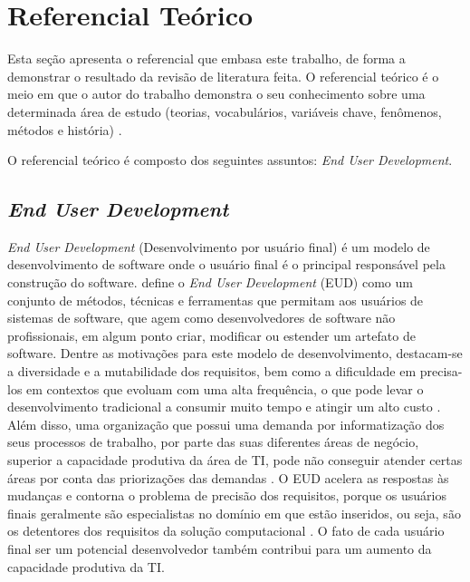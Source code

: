 \chapter[Referencial Teórico]{Referencial Teórico}

Esta seção apresenta o referencial que embasa este trabalho, de forma a demonstrar o resultado da revisão de literatura feita. O referencial teórico é o meio em que o autor do trabalho demonstra o seu conhecimento sobre uma determinada área de estudo (teorias, vocabulários, variáveis chave, fenômenos, métodos e história) \cite{randolph2009}.

O referencial teórico é composto dos seguintes assuntos: \textit{End User Development}.


\section{\textit{End User Development}}

\textit{End User Development} (Desenvolvimento por usuário final) é um modelo de desenvolvimento de software onde o usuário final é o principal responsável pela construção do software.  define o \textit{End User Development} (EUD) como um conjunto de métodos, técnicas e ferramentas que permitam aos usuários de sistemas de software, que agem como desenvolvedores de software não profissionais, em algum ponto criar, modificar ou estender um artefato de software. Dentre as motivações para este modelo de desenvolvimento, destacam-se a diversidade e a mutabilidade dos requisitos, bem como a dificuldade em precisa-los em contextos que evoluam com uma alta frequência, o que pode levar o desenvolvimento tradicional a consumir muito tempo e atingir um alto custo \cite{lieberman2006}. Além disso, uma organização que possui uma demanda por informatização dos seus processos de trabalho, por parte das suas diferentes áreas de negócio, superior a capacidade produtiva da área de TI, pode não conseguir atender certas áreas por conta das priorizações das demandas \cite{artigoTcuGovTI}. O EUD acelera as respostas às mudanças e contorna o problema de precisão dos requisitos, porque os usuários finais geralmente são especialistas no domínio em que estão inseridos, ou seja, são os detentores dos requisitos da solução computacional \cite{fischer2004}. O fato de cada usuário final ser um potencial desenvolvedor também contribui para um aumento da capacidade produtiva da TI.

